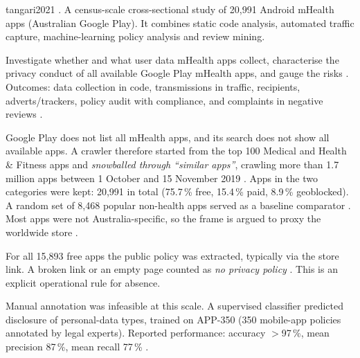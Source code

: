 \begin{papercard}{tangari2021}
   . A census-scale cross-sectional study of 20{,}991 Android mHealth apps (Australian Google Play). It combines static code analysis, automated traffic capture, machine-learning policy analysis and review mining.

 Investigate whether and what user data mHealth apps collect, characterise the privacy conduct of all available Google Play mHealth apps, and gauge the risks . Outcomes: data collection in code, transmissions in traffic, recipients, adverts/trackers, policy audit with compliance, and complaints in negative reviews .

 Google Play does not list all mHealth apps, and its search does not show all available apps. A crawler therefore started from the top 100 Medical and Health \& Fitness apps and \emph{snowballed through ``similar apps''}, crawling more than 1.7 million apps between 1 October and 15 November 2019 . Apps in the two categories were kept: 20{,}991 in total (75.7\,\% free, 15.4\,\% paid, 8.9\,\% geoblocked). A random set of 8{,}468 popular non-health apps served as a baseline comparator . Most apps were not Australia-specific, so the frame is argued to proxy the worldwide store .

 For all 15{,}893 free apps the public policy was extracted, typically via the store link. A broken link or an empty page counted as \emph{no privacy policy} . This is an explicit operational rule for absence.

 Manual annotation was infeasible at this scale. A supervised classifier predicted disclosure of personal-data types, trained on APP-350 (350 mobile-app policies annotated by legal experts). Reported performance: accuracy $>$97\,\%, mean precision 87\,\%, mean recall 77\,\% .


\end{papercard}
